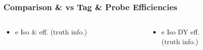 \documentclass{beamer}
\begin{document}
\begin{frame}
 \frametitle{Comparison \ttbar \& \wpj vs Tag \& Probe Efficiencies}
  \begin{columns}

   \begin{column}{0.33\textwidth}
     \begin{itemize}
   \item e Iso \ttbar \& \wpj eff. (truth info.)
  \end{itemize}
   \end{column}
   \begin{column}{0.33\textwidth}
   \begin{itemize}
    \item e Iso DY eff.\\ (truth info.)
   \end{itemize}


\end{column}
\end{columns}
\end{frame}
\end{document}

